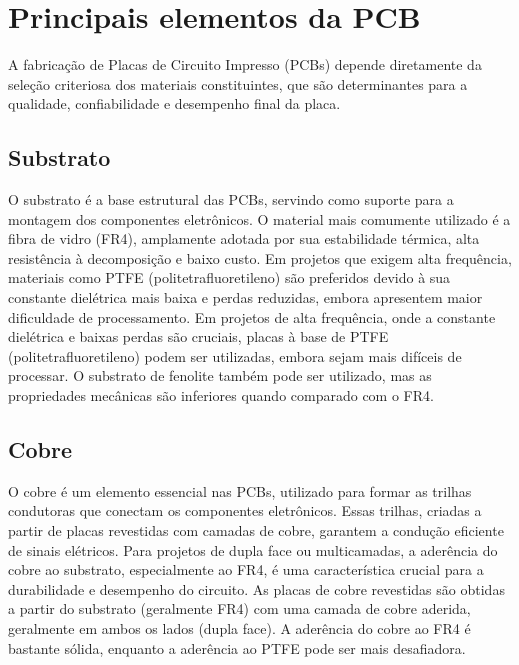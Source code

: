 \hypertarget{principais-elementos-da-pcb}{%
\section{Principais elementos da PCB}\label{principais-elementos-da-pcb}}

A fabricação de Placas de Circuito Impresso (PCBs) depende diretamente da seleção criteriosa dos materiais constituintes, que são determinantes para a qualidade, confiabilidade e desempenho final da placa.

\hypertarget{substrato}{%
\subsection{Substrato}\label{substrato}}

O substrato é a base estrutural das PCBs, servindo como suporte para a montagem dos componentes eletrônicos. O material mais comumente utilizado é a fibra de vidro (FR4), amplamente adotada por sua estabilidade térmica, alta resistência à decomposição e baixo custo. Em projetos que exigem alta frequência, materiais como PTFE (politetrafluoretileno) são preferidos devido à sua constante dielétrica mais baixa e perdas reduzidas, embora apresentem maior dificuldade de processamento. Em projetos de alta frequência, onde a constante dielétrica e baixas perdas são cruciais, placas à base de PTFE (politetrafluoretileno) podem ser utilizadas, embora sejam mais difíceis de processar. O substrato de fenolite também pode ser utilizado, mas as propriedades mecânicas são inferiores quando comparado com o FR4.

\hypertarget{cobre}{%
\subsection{Cobre}\label{cobre}}

O cobre é um elemento essencial nas PCBs, utilizado para formar as trilhas condutoras que conectam os componentes eletrônicos. Essas trilhas, criadas a partir de placas revestidas com camadas de cobre, garantem a condução eficiente de sinais elétricos. Para projetos de dupla face ou multicamadas, a aderência do cobre ao substrato, especialmente ao FR4, é uma característica crucial para a durabilidade e desempenho do circuito. As placas de cobre revestidas são obtidas a partir do substrato (geralmente FR4) com uma camada de cobre aderida, geralmente em ambos os lados (dupla face). A aderência do cobre ao FR4 é bastante sólida, enquanto a aderência ao PTFE pode ser mais desafiadora.

